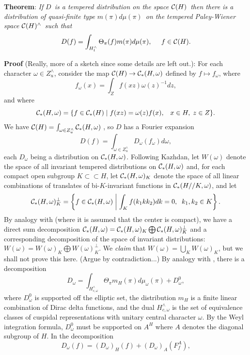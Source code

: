 \documentclass[11pt, a4paper]{article}
\begin{document}
{\bf Theorem}: {\em If }$D${\em \ is a tempered distribution on the space }$%
{\cal C}(H)${\em \ then there is a distribution of quasi-finite type }$%
m(\pi )d\mu (\pi )${\em \ on the tempered Paley-Wiener space }${\cal C}%
(H)^{\wedge }${\em \ such that}
\[
D(f)=\int_{H_t^{\wedge }}\Theta _\pi (f)m(\pi )d\mu (\pi ),\;\;\;\;\;f\in 
{\cal C}(H).
\]

{\bf Proof} (Really, more of a sketch since some details are left out.): For
each character $\omega \in Z_u^{\wedge }$, consider the map ${\cal C}%
(H)\rightarrow {\cal C}_{*}(H,\omega )$ defined by $f\longmapsto f_\omega $,
where
\[
f_\omega (x)=\int_Zf(xz)\omega (z)^{-1}dz,
\]
and where
\[
{\cal C}_{*}(H,\omega )=\{f\in {\cal C}_{*}(H)\;|\;f(xz)=\omega
(z)f(x),\;\;\;x\in H,\;z\in Z\}.
\]
We have ${\cal C}(H)=\int_{\omega \in Z_u^{\wedge }}{\cal C}_{*}(H,\omega )$%
, so $D$ has a Fourier expansion
\[
D(f)=\int_{\omega \in Z_u^{\wedge }}D_\omega (f_\omega )d\omega ,
\]
each $D_\omega $ being a distribution on ${\cal C}_{*}(H,\omega )$.
Following Kazhdan, let $W(\omega )$ denote the space of all invariant
tempered distributions on ${\cal C}_{*}(H,\omega )$ and, for each compact
open subgroup $K\subset \subset H$, let ${\cal C}_{*}(H,\omega )_K$ denote
the space of all linear combinations of translates of bi-$K$-invariant
functions in ${\cal C}_{*}(H//K,\omega )$, and let
\[
{\cal C}_{*}(H,\omega )_K^{\perp }=\left\{f\in {\cal C}_{*}(H,\omega
)\;\middle|\;\int_Kf(k_1kk_2)dk=0,\;\;k_1,k_2\in K\right\}.
\]
By analogy with \cite[\S 4]{K} (where it is assumed that the center is
compact), we have a direct sum decomposition ${\cal C}_{*}(H,\omega )={\cal C%
}_{*}(H,\omega )_K\bigoplus {\cal C}_{*}(H,\omega )_K^{\perp }$ and a corresponding
decomposition of the space of invariant distributions: $W(\omega )=W(\omega
)_K\bigoplus W(\omega )_K^{\perp }$. We {\em claim} that $W(\omega
)=\bigcup_KW(\omega )_K$, but we shall not prove this here. (Argue by
contradiction...) By analogy with \cite[\S 4, Lemma~5]{K}, there is a
decomposition
\[
D_\omega =\int_{H_{c,\omega }^{\wedge }}\Theta _\pi m_H(\pi )d\mu _\omega
(\pi )+D_\omega ^0,
\]
where $D_\omega ^0$ is supported off the elliptic set, the distribution $m_H$
is a finite linear combination of Dirac delta functions, and the dual $%
H_{c,\omega }^{\wedge }$ is the set of equivalence classes of cuspidal
representations with unitary central character $\omega $. By the Weyl
integration formula, $D_\omega ^0$ must be supported on $A^H$ where $A$
denotes the diagonal subgroup of $H$. In the decomposition
\[
D_\omega (f)=(D_\omega )_H(f)+(D_\omega )_A(F_f^A),
\]
\end{document}
